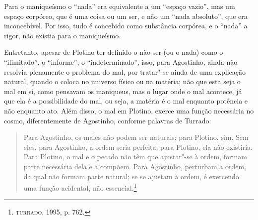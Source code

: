 Para o maniqueísmo o “nada” era equivalente a um “espaço vazio”,
mas um espaço corpóreo, que é uma coisa ou um ser, e não um 
“nada absoluto”, que era inconcebível. Por isso, tudo é
concebido como substância corpórea, e o “nada” a rigor, não
existia para o maniqueísmo.

Entretanto,  apesar de Plotino ter definido o não ser (ou o nada)
como o “ilimitado”, o “informe”, o “indeterminado”, isso, para
Agostinho, ainda não resolvia plenamente o problema do mal, por
tratar"-se ainda de uma explicação natural, quando o coloca no
universo físico ou na matéria;  não que  esta seja o mal em si,
como pensavam os maniqueus, mas  o lugar onde o mal acontece, já
que ela é a possibilidade do mal, ou seja, a matéria é o mal
enquanto potência e não enquanto ato. Além disso, o mal em
Plotino, exerce  uma função necessária no cosmo, diferentemente
de Agostinho, conforme palavras de Turrado: 

\begin{quote}
Para  Agostinho, os males não podem ser naturais; para Plotino, 
sim. Sem eles, para Agostinho, a ordem seria  perfeita; para
Plotino, ela não existiria.  Para Plotino, o mal e o pecado não
têm que ajustar"-se à ordem, formam parte  necessária dela e a
compõem. Para Agostinho, perturbam a ordem, da qual não formam
parte natural; se se ajustam  à ordem,  é  exercendo uma função
acidental, não essencial.\footnote{ \textsc{turrado}, 1995, p. 762.} 
\end{quote}

